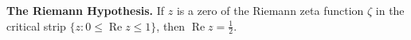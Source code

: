 \textbf{The Riemann Hypothesis.} If $z$ is a zero of the Riemann zeta function $\zeta$ in the critical strip $\{z : 0 \leq \operatorname{Re} z \leq 1\}$, then $\operatorname{Re} z = \frac{1}{2}$.
